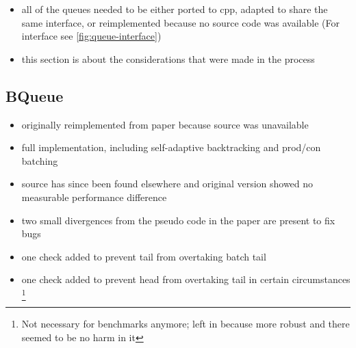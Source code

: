 \begin{itemize}
    \item all of the queues needed to be either ported to cpp, adapted to share the same interface, or
        reimplemented because no source code was available (For interface see \autoref{fig:queue-interface})
    \item this section is about the considerations that were made in the process
\end{itemize}

\subsection{BQueue}
\begin{itemize}
    \item originally reimplemented from paper because source was unavailable
    \item full implementation, including self-adaptive backtracking and prod/con batching
    \item source has since been found elsewhere and original version showed no measurable performance difference
    \item two small divergences from the pseudo code in the paper are present to fix bugs
    \item one check added to prevent tail from overtaking batch tail
    \item one check added to prevent head from overtaking tail in certain circumstances
        \footnote{Not necessary for benchmarks anymore; left in because more robust and there seemed to be no
        harm in it}
\end{itemize}


